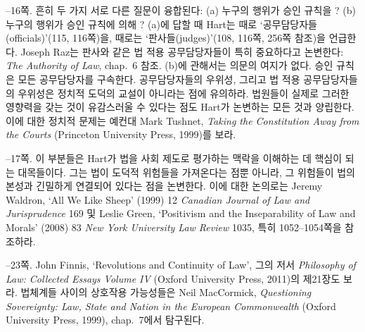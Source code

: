 {--16쪽.  흔히 두 가지 서로 다른 질문이 융합된다: (a) 누구의 행위가 승인
규칙을 ? (b) 누구의 행위가 승인 규칙에 의해
? (a)에 답할 때 Hart는 때로
‘공무담당자들(officials)’(115, 116쪽)을, 때로는 ‘판사들(judges)’(108,
116쪽, 256쪽 참조)을 언급한다. Joseph Raz는 판사와 같은 법 적용
공무담당자들이 특히 중요하다고 논변한다: \emph{The Authority of Law},
chap.~6 참조. (b)에 관해서는 의문의 여지가 없다. 승인 규칙은 모든
공무담당자를 구속한다. 공무담당자들의 우위성, 그리고 법 적용
공무담당자들의 우위성은 정치적 도덕의 교설이 아니라는 점에 유의하라.
법원들이 실제로 그러한 영향력을 갖는 것이 유감스러울 수 있다는 점도
Hart가 논변하는 모든 것과 양립한다. 이에 대한 정치적 문제는 예컨대 Mark
Tushnet, \emph{Taking the Constitution Away from the Courts} (Princeton
University Press, 1999)를 보라.

--17쪽.  이 부분들은 Hart가 법을 사회 제도로 평가하는 맥락을 이해하는 데 핵심이
되는 대목들이다. 그는 법이 도덕적 위험들을 가져온다는 점뿐 아니라, 그
위험들이 법의 본성과 긴밀하게 연결되어 있다는 점을 논변한다. 이에 대한
논의로는 Jeremy Waldron, `All We Like Sheep' (1999) 12 \emph{Canadian
Journal of Law and Jurisprudence} 169 및 Leslie Green, `Positivism and
the Inseparability of Law and Morals' (2008) 83 \emph{New York
University Law Review} 1035, 특히 1052--1054쪽을 참조하라.

--23쪽.  John
Finnis, `Revolutions and Continuity of Law', 그의 저서 \emph{Philosophy
of Law: Collected Essays Volume IV} (Oxford University Press, 2011)의
제21장도 보라. 법체계들 사이의 상호작용 가능성들은 Neil MacCormick,
\emph{Questioning Sovereignty: Law, State and Nation in the European
Commonwealth} (Oxford University Press, 1999), chap.~7에서 탐구된다.
}
